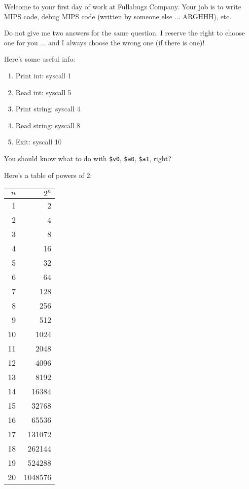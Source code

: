 Welcome to your first day of work at Fullabugz Company.
Your job is to write MIPS
code, debug MIPS code (written by someone else ... ARGHHH), etc.

%

Do not give me two answers for the same question.
I reserve the right to choose one
for you ...  and I always choose the wrong one (if there is one)!

Here's some useful info:
\begin{enumerate}[nosep]
\item Print int: syscall 1
\item Read int: syscall 5
\item Print string: syscall 4
\item Read string: syscall 8
\item Exit: syscall 10
\end{enumerate}
You should know what to do with \verb!$v0!, \verb!$a0!, \verb!$a1!, right?
\vspace{1cm}

Here's a table of powers of 2:
\begin{longtable}{|r|r|}
\hline
$n$ & $2^n$ \\
\hline
1  & 2       \\
2  & 4       \\
3  & 8       \\
4  & 16      \\
5  & 32      \\
6  & 64      \\
7  & 128     \\
8  & 256     \\
9  & 512     \\
10 & 1024    \\
11 & 2048    \\
12 & 4096    \\
13 & 8192    \\
14 & 16384   \\
15 & 32768   \\
16 & 65536   \\
17 & 131072  \\
18 & 262144  \\
19 & 524288  \\
20 & 1048576 \\
\hline
\end{longtable}

